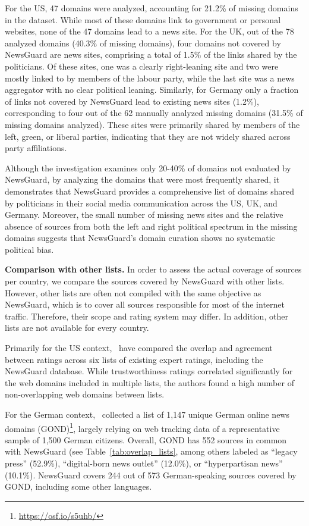 \documentclass[12pt,twoside]{article}
\begin{document}
For the US, 47 domains were analyzed, accounting for 21.2\% of missing domains in the dataset. 
While most of these domains link to government or personal websites, none of the 47 domains lead to a news site. 
For the UK, out of the 78 analyzed domains (40.3\% of missing domains), four domains not covered by NewsGuard are news sites, comprising a total of 1.5\% of the links shared by the politicians. 
Of these sites, one was a clearly right-leaning site and two were mostly linked to by members of the labour party, while the last site was a news aggregator with no clear political leaning.
Similarly, for Germany only a fraction of links not covered by NewsGuard lead to existing news sites (1.2\%), corresponding to four out of the 62 manually analyzed missing domains (31.5\% of missing domains analyzed). 
These sites were primarily shared by members of the left, green, or liberal parties, indicating that they are not widely shared across party affiliations.

Although the investigation examines only 20-40\% of domains not evaluated by NewsGuard, by analyzing the domains that were most frequently shared, it demonstrates that NewsGuard provides a comprehensive list of domains shared by politicians in their social media communication across the US, UK, and Germany. 
Moreover, the small number of missing news sites and the relative absence of sources from both the left and right political spectrum in the missing domains suggests that NewsGuard's domain curation shows no systematic political bias.


\textbf{Comparison with other lists.} 
In order to assess the actual coverage of sources per country, we compare the sources covered by NewsGuard with other lists. 
However, other lists are often not compiled with the same objective as NewsGuard, which is to cover all sources responsible for most of the internet traffic. Therefore, their scope and rating system may differ. 
In addition, other lists are not available for every country. 

Primarily for the US context,~\citet{linHighLevelCorrespondence2023a} have compared the overlap and agreement between ratings across six lists of existing expert ratings, including the NewsGuard database. 
While trustworthiness ratings correlated significantly for the web domains included in multiple lists, the authors found a high number of non-overlapping web domains between lists. 

For the German context,~\citet{puschmannGermanOnlineNews2023a} collected a list of 1,147 unique German online news domains (GOND)\footnote{\href{https://osf.io/s5uhb/}{https://osf.io/s5uhb/}}, largely relying on web tracking data of a representative sample of 1,500 German citizens. 
Overall, GOND has 552 sources in common with NewsGuard (see Table~\ref{tab:overlap_lists}, among others labeled as ``legacy press'' (52.9\%), ``digital-born news outlet'' (12.0\%), or ``hyperpartisan news'' (10.1\%). 
NewsGuard covers 244 out of 573 German-speaking sources covered by GOND, including some other languages.
\end{document}
